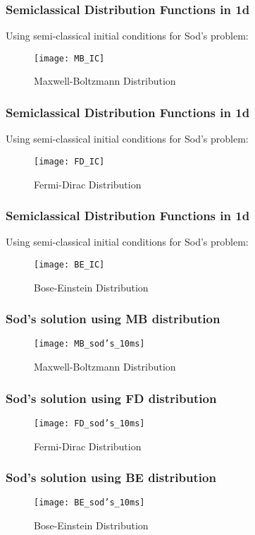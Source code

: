 \documentclass[11pt,fleqn]{beamer}
\begin{document}
\begin{frame}
	\frametitle{Semiclassical Distribution Functions in 1d}
	Using semi-classical initial conditions for Sod's problem:
	\begin{figure}[p1]
	\centering
	\texttt{[image: MB\_IC]}%
	\caption{Maxwell-Boltzmann Distribution}
	\end{figure}
\end{frame}

\begin{frame}
	\frametitle{Semiclassical Distribution Functions in 1d}
	Using semi-classical initial conditions for Sod's problem:
	\begin{figure}[p2]
	\centering
	\texttt{[image: FD\_IC]}%
	\caption{Fermi-Dirac Distribution}
	\end{figure}
\end{frame}

\begin{frame}
	\frametitle{Semiclassical Distribution Functions in 1d}
	Using semi-classical initial conditions for Sod's problem:
	\begin{figure}[p3]
	\centering
	\texttt{[image: BE\_IC]}%
	\caption{Bose-Einstein Distribution}
	\end{figure}
\end{frame}

\begin{frame}
	\frametitle{Sod's solution using MB distribution}
	\begin{figure}[p4]
	\centering
	\texttt{[image: MB\_sod's\_10ms]}%
	\caption{Maxwell-Boltzmann Distribution}
	\end{figure}
\end{frame}

\begin{frame}
	\frametitle{Sod's solution using FD distribution}
	\begin{figure}[p5]
	\centering
	\texttt{[image: FD\_sod's\_10ms]}%
	\caption{Fermi-Dirac Distribution}
	\end{figure}
\end{frame}

\begin{frame}
	\frametitle{Sod's solution using BE distribution}
	\begin{figure}[p6]
	\centering
	\texttt{[image: BE\_sod's\_10ms]}%
	\caption{Bose-Einstein Distribution}
	\end{figure}
\end{frame}
\end{document}
